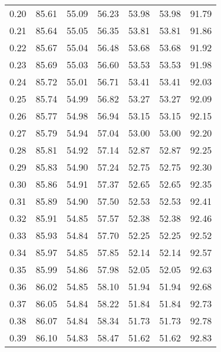 \begin{tabular}{|c|c|c|c|c|c|c|}
      0.20 &     85.61 &     55.09 &      56.23 &   53.98 &      53.98 &         91.79 \\
      0.21 &     85.64 &     55.05 &      56.35 &   53.81 &      53.81 &         91.86 \\
      0.22 &     85.67 &     55.04 &      56.48 &   53.68 &      53.68 &         91.92 \\
      0.23 &     85.69 &     55.03 &      56.60 &   53.53 &      53.53 &         91.98 \\
      0.24 &     85.72 &     55.01 &      56.71 &   53.41 &      53.41 &         92.03 \\
      0.25 &     85.74 &     54.99 &      56.82 &   53.27 &      53.27 &         92.09 \\
      0.26 &     85.77 &     54.98 &      56.94 &   53.15 &      53.15 &         92.15 \\
      0.27 &     85.79 &     54.94 &      57.04 &   53.00 &      53.00 &         92.20 \\
      0.28 &     85.81 &     54.92 &      57.14 &   52.87 &      52.87 &         92.25 \\
      0.29 &     85.83 &     54.90 &      57.24 &   52.75 &      52.75 &         92.30 \\
      0.30 &     85.86 &     54.91 &      57.37 &   52.65 &      52.65 &         92.35 \\
      0.31 &     85.89 &     54.90 &      57.50 &   52.53 &      52.53 &         92.41 \\
      0.32 &     85.91 &     54.85 &      57.57 &   52.38 &      52.38 &         92.46 \\
      0.33 &     85.93 &     54.84 &      57.70 &   52.25 &      52.25 &         92.52 \\
      0.34 &     85.97 &     54.85 &      57.85 &   52.14 &      52.14 &         92.57 \\
      0.35 &     85.99 &     54.86 &      57.98 &   52.05 &      52.05 &         92.63 \\
      0.36 &     86.02 &     54.85 &      58.10 &   51.94 &      51.94 &         92.68 \\
      0.37 &     86.05 &     54.84 &      58.22 &   51.84 &      51.84 &         92.73 \\
      0.38 &     86.07 &     54.84 &      58.34 &   51.73 &      51.73 &         92.78 \\
      0.39 &     86.10 &     54.83 &      58.47 &   51.62 &      51.62 &         92.83 \\

\end{tabular}
